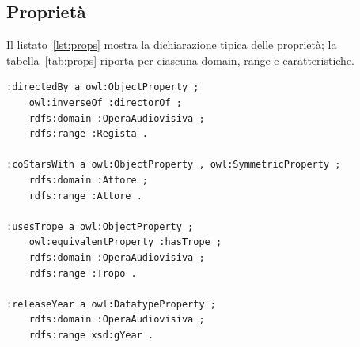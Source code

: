 \documentclass[a4paper,11pt]{article}
\begin{document}
\subsection{Propriet\`a}

Il listato~\ref{lst:props} mostra la dichiarazione tipica delle
propriet\`a; la tabella~\ref{tab:props} riporta per ciascuna domain, range
e caratteristiche.

\begin{lstlisting}[style=ttl, caption={Frammento dell'ontologia:
propriet\`a inverse, simmetriche ed equivalente.}, label={lst:props}]
:directedBy a owl:ObjectProperty ;
    owl:inverseOf :directorOf ;
    rdfs:domain :OperaAudiovisiva ;
    rdfs:range :Regista .

:coStarsWith a owl:ObjectProperty , owl:SymmetricProperty ;
    rdfs:domain :Attore ;
    rdfs:range :Attore .

:usesTrope a owl:ObjectProperty ;
    owl:equivalentProperty :hasTrope ;
    rdfs:domain :OperaAudiovisiva ;
    rdfs:range :Tropo .

:releaseYear a owl:DatatypeProperty ;
    rdfs:domain :OperaAudiovisiva ;
    rdfs:range xsd:gYear .
\end{lstlisting}
\end{document}

